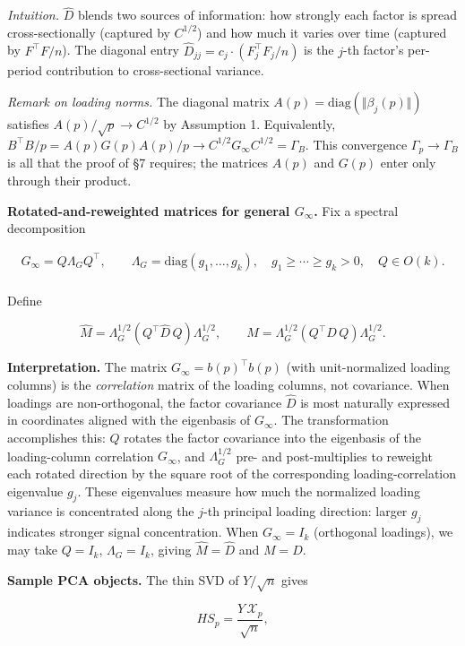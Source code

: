 \documentclass{article}
\theoremstyle{remark}
\begin{document}
\textit{Intuition.} $\hat{D}$ blends two sources of information: how strongly each factor is spread cross-sectionally (captured by $C^{1/2}$) and how much it varies over time (captured by $F^\top F/n$). The diagonal entry $\hat{D}_{jj} = c_j\cdot (F_j^\top F_j/n)$ is the $j$-th factor's per-period contribution to cross-sectional variance.

\textit{Remark on loading norms.} The diagonal matrix $A(p) = \mathrm{diag}(\Vert \beta_j(p)\Vert )$ satisfies $A(p)/\sqrt{p} \to C^{1/2}$ by Assumption 1. Equivalently, $B^\top B/p = A(p)G(p)A(p)/p \to C^{1/2}G_\infty C^{1/2} = \Gamma_B$. This convergence $\Gamma_p \to \Gamma_B$ is all that the proof of §7 requires; the matrices $A(p)$ and $G(p)$ enter only through their product.

\textbf{Rotated-and-reweighted matrices for general $G_\infty$.} Fix a spectral decomposition

\begin{align*}
G_\infty = Q\Lambda_G Q^\top, \qquad \Lambda_G = \mathrm{diag}(g_1,\ldots,g_k),\quad g_1\ge\cdots\ge g_k>0,\quad Q\in O(k).\\ \tag{2}
\end{align*}

Define

\[
\hat{M} = \Lambda_G^{1/2}(Q^\top \hat{D}\,Q)\Lambda_G^{1/2}, \qquad M = \Lambda_G^{1/2}(Q^\top D\,Q)\Lambda_G^{1/2}. \tag{3}
\]

\textbf{Interpretation.} The matrix $G_\infty = b(p)^\top b(p)$ (with unit-normalized loading columns) is the \textit{correlation} matrix of the loading columns, not covariance. When loadings are non-orthogonal, the factor covariance $\hat{D}$ is most naturally expressed in coordinates aligned with the eigenbasis of $G_\infty$. The transformation accomplishes this: $Q$ rotates the factor covariance into the eigenbasis of the loading-column correlation $G_\infty$, and $\Lambda_G^{1/2}$ pre- and post-multiplies to reweight each rotated direction by the square root of the corresponding loading-correlation eigenvalue $g_j$. These eigenvalues measure how much the normalized loading variance is concentrated along the $j$-th principal loading direction: larger $g_j$ indicates stronger signal concentration. When $G_\infty = I_k$ (orthogonal loadings), we may take $Q = I_k$, $\Lambda_G = I_k$, giving $\hat{M} = \hat{D}$ and $M = D$.

\textbf{Sample PCA objects.} The thin SVD of $Y/\sqrt{n}$ gives

\[
H S_p = \frac{Y\,\mathcal{X}_p}{\sqrt{n}}, \tag{4}
\]
\end{document}
